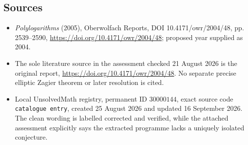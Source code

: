 \documentclass[11pt]{article}
\begin{document}
\subsection{Sources}
\begin{itemize}
\item \emph{Polylogarithms} (2005), Oberwolfach Reports, DOI 10.4171/owr/2004/48, pp. 2539--2590, \url{https://doi.org/10.4171/owr/2004/48}; proposed year supplied as 2004.
\item The sole literature source in the assessment checked 21 August 2026 is the original report, \url{https://doi.org/10.4171/owr/2004/48}. No separate precise elliptic Zagier theorem or later resolution is cited.
\item Local UnsolvedMath registry, permanent ID $30000144$, exact source code \texttt{catalogue entry}, created 25 August 2026 and updated 16 September 2026. The clean wording is labelled corrected and verified, while the attached assessment explicitly says the extracted programme lacks a uniquely isolated conjecture.
\end{itemize}
\end{document}
